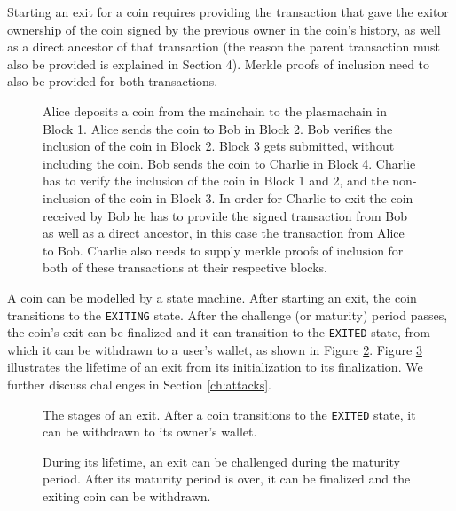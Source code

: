 Starting an exit for a coin requires providing the transaction that gave the
exitor ownership of the coin signed by the previous owner in the coin's history, as well
as a direct ancestor of that transaction (the reason the parent transaction must also be provided is explained in Section 4). Merkle proofs of inclusion need to also be provided for both transactions.

\begin{figure}[H]
	\caption{
        Alice deposits a coin from the mainchain to the plasmachain in Block 1. Alice sends the coin to Bob in Block 2. Bob verifies the inclusion of the coin in Block 2. Block 3 gets submitted, without including the coin. Bob sends the coin to Charlie in Block 4. Charlie has to verify the inclusion of the coin in Block 1 and 2, and the non-inclusion of the coin in Block 3. 
        In order for Charlie to exit the coin received by Bob he has to provide
        the signed transaction from Bob as well as a direct ancestor, in this
        case the transaction from Alice to Bob. Charlie also needs to supply
        merkle proofs of inclusion for both of these transactions at their
        respective blocks. 
	}
    \label{fig:exit_lifetime}
\end{figure}

A coin can be modelled by a state machine. After starting an exit, the coin transitions to the \texttt{EXITING} 
state. After the challenge (or maturity) period passes, 
the coin's exit can be finalized and it can transition to the \texttt{EXITED} 
state, from which it can be withdrawn to a user's wallet, 
as shown in Figure
\ref{fig:exit_state_machine}. Figure \ref{fig:exit_lifetime} illustrates the 
lifetime of an exit from its initialization to its finalization. 
We further discuss challenges in Section \ref{ch:attacks}.
\begin{figure}[H]
	\caption{
        The stages of an exit. After a coin transitions to the \texttt{EXITED}
        state, it can be withdrawn to its owner's wallet.
	}
    \label{fig:exit_state_machine}
\end{figure}


\begin{figure}[H]
	\caption{
		During its lifetime, an exit can be challenged during the maturity period. After its maturity period is over, it can be
        finalized and the exiting coin can be withdrawn.
	}
    \label{fig:exit_lifetime}
\end{figure}
